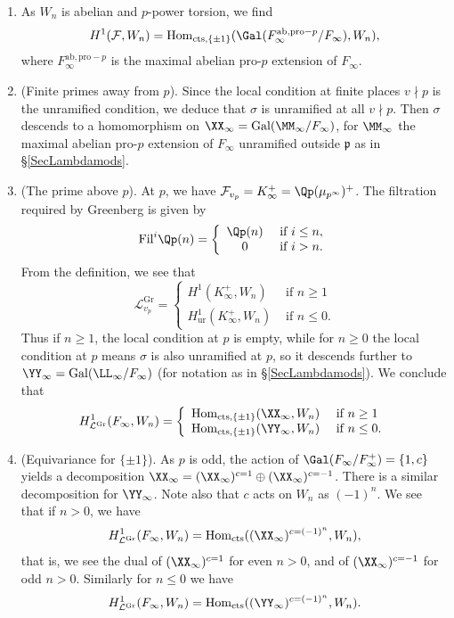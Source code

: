 \documentclass[a4paper,10pt, english, reqno]{smfart}
\newcommand{\cF}{\mathcal{F}}
\numberwithin{equation}{section}
\begin{document}
\begin{enumerate}

\item As $W_n$ is abelian and $p$-power torsion, we find 
\[
    H^1(\cF,W_n) = \mathrm{Hom}_{\mathrm{cts}, \{\pm 1\}}(\Gal(F_\infty^{\mathrm{ab},\mathrm{pro}-p}/F_\infty), W_n),
\]
where $F_\infty^{\mathrm{ab},\mathrm{pro}-p}$ is the maximal abelian pro-$p$ extension of $F_\infty$.

\item (Finite primes away from $p$). Since the local condition at finite places $v\nmid p$ is the unramified condition, we deduce that $\sigma$ is unramified at all $v \nmid p$. Then $\sigma$ descends to a homomorphism on $\XX_\infty = \mathrm{Gal}(\MM_\infty/F_\infty)$, for $\MM_\infty$ the maximal abelian pro-$p$ extension of $F_\infty$ unramified outside $\mathfrak{p}$ as in \S \ref{SecLambdamods}.

\item (The prime above $p$). At $p$, we have $\cF_{v_p} = K_\infty^+ = \Qp(\mu_{p^\infty})^+$. The filtration required by Greenberg is given by
\[
    \mathrm{Fil}^i \Qp(n) = \left\{\begin{array}{cl} \Qp(n) & \text{ if } i \leq n, \\
    0 & \text{ if } i > n.\end{array}\right.
\]
From the definition, we see that
\[
    \mathcal{L}^{\mathrm{Gr}}_{v_p} = \left\{\begin{array}{cl} H^1(K_\infty^+, W_n) & \text{ if } n \geq 1\\
    H^1_{\mathrm{ur}}(K_{\infty}^+,W_n) & \text{ if } n \leq 0.
    \end{array}\right.
\]
Thus if $n \geq 1$, the local condition at $p$ is empty, while for $n \geq 0$ the local condition at $p$ means $\sigma$ is also unramified at $p$, so it descends further to $\YY_\infty = \mathrm{Gal}(\LL_\infty/F_\infty)$ (for notation as in \S \ref{SecLambdamods}). We conclude that
\[
H^1_{\mathcal{L}^{\mathrm{Gr}}}(F_\infty, W_n) = \left\{\begin{array}{cl} \mathrm{Hom}_{\mathrm{cts}, \{\pm1\}}(\XX_\infty, W_n) & \text{ if } n \geq 1\\
    \mathrm{Hom}_{\mathrm{cts}, \{\pm1 \}}(\YY_\infty, W_n) & \text{ if } n \leq 0.
    \end{array}\right.
\]

\item (Equivariance for $\{\pm 1\}$). As $p$ is odd, the action of $\Gal(F_\infty/F_\infty^+) = \{1,c\}$ yields a decomposition $\XX_\infty = (\XX_\infty)^{c = 1} \oplus (\XX_\infty)^{c = -1}$. There is a similar decomposition for $\YY_\infty$. Note also that $c$ acts on $W_n$ as $(-1)^n$. We see that if $n > 0$, we have
\[
H^1_{\mathcal{L}^{\mathrm{Gr}}}(F_\infty, W_n) = \mathrm{Hom}_{\mathrm{cts}}((\XX_\infty)^{c = (-1)^n}, W_n),
\]
that is, we see the dual of $(\XX_\infty)^{c = 1}$ for even $n > 0$, and of $(\XX_\infty)^{c = -1}$ for odd $n > 0$. Similarly for $n \leq 0$ we have
\[
H^1_{\mathcal{L}^{\mathrm{Gr}}}(F_\infty, W_n) = \mathrm{Hom}_{\mathrm{cts}}((\YY_\infty)^{c=(-1)^n}, W_n).
\]
\end{enumerate}
\end{document}
